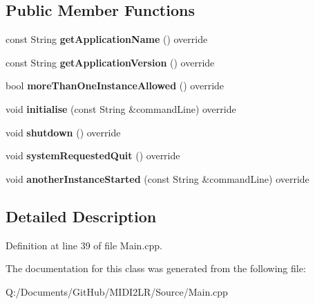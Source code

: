 \subsection*{Public Member Functions}
\begin{DoxyCompactItemize}
\item 
const String {\bfseries get\+Application\+Name} () override\hypertarget{class_m_i_d_i2_l_r_application_ac53e19496aa202117c45cae154cf7489}{}\label{class_m_i_d_i2_l_r_application_ac53e19496aa202117c45cae154cf7489}

\item 
const String {\bfseries get\+Application\+Version} () override\hypertarget{class_m_i_d_i2_l_r_application_a51fc49ef00c85168d30427eb77d023c7}{}\label{class_m_i_d_i2_l_r_application_a51fc49ef00c85168d30427eb77d023c7}

\item 
bool {\bfseries more\+Than\+One\+Instance\+Allowed} () override\hypertarget{class_m_i_d_i2_l_r_application_abd55f782b5d696a1d6df5ab3ee03f816}{}\label{class_m_i_d_i2_l_r_application_abd55f782b5d696a1d6df5ab3ee03f816}

\item 
void {\bfseries initialise} (const String \&command\+Line) override\hypertarget{class_m_i_d_i2_l_r_application_ae503f1d36a80e653cfb197664ab1bcdc}{}\label{class_m_i_d_i2_l_r_application_ae503f1d36a80e653cfb197664ab1bcdc}

\item 
void {\bfseries shutdown} () override\hypertarget{class_m_i_d_i2_l_r_application_ab5c41060c26b2d07197651ad3f74f62f}{}\label{class_m_i_d_i2_l_r_application_ab5c41060c26b2d07197651ad3f74f62f}

\item 
void {\bfseries system\+Requested\+Quit} () override\hypertarget{class_m_i_d_i2_l_r_application_a09e3d213ac5693825d76199c20260f3f}{}\label{class_m_i_d_i2_l_r_application_a09e3d213ac5693825d76199c20260f3f}

\item 
void {\bfseries another\+Instance\+Started} (const String \&command\+Line) override\hypertarget{class_m_i_d_i2_l_r_application_a21cbb808b1a642fc6bce2899bcd63cbb}{}\label{class_m_i_d_i2_l_r_application_a21cbb808b1a642fc6bce2899bcd63cbb}

\end{DoxyCompactItemize}


\subsection{Detailed Description}


Definition at line 39 of file Main.\+cpp.



The documentation for this class was generated from the following file\+:\begin{DoxyCompactItemize}
\item 
Q\+:/\+Documents/\+Git\+Hub/\+M\+I\+D\+I2\+L\+R/\+Source/Main.\+cpp\end{DoxyCompactItemize}

